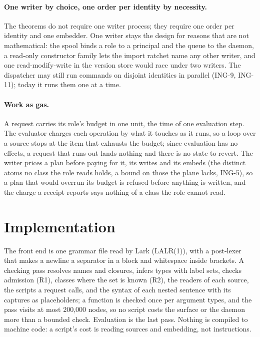 \documentclass[11pt]{article}
\theoremstyle{plain}
\theoremstyle{definition}
\theoremstyle{remark}
\newcommand{\ing}[1]{ING-#1}
\begin{document}
\paragraph{One writer by choice, one order per identity by necessity.}
The theorems do not require one writer process; they require one order per identity and one
embedder. One writer stays the design for reasons that are not mathematical: the spool binds a
role to a principal and the queue to the daemon, a read-only constructor family lets the import
ratchet name any other writer, and one read-modify-write in the version store would race under
two writers. The dispatcher may still run commands on disjoint identities in parallel
(\ing{9}, \ing{11}); today it runs them one at a time.

\paragraph{Work as gas.}
A request carries its role's budget in one unit, the time of one evaluation step. The evaluator
charges each operation by what it touches as it runs, so a loop over a source stops at the item
that exhausts the budget; since evaluation has no effects, a request that runs out lands
nothing and there is no state to revert. The writer prices a plan before paying for it, its
writes and its embeds (the distinct atoms no class the role reads holds, a bound on those the
plane lacks, \ing{5}), so a plan that would overrun its budget is refused before anything is
written, and the charge a receipt reports says nothing of a class the role cannot read.

\section{Implementation}

The front end is one grammar file read by Lark (LALR(1)), with a post-lexer that makes a newline
a separator in a block and whitespace inside brackets. A checking pass resolves names and
closures, infers types with label sets, checks admission (R1), classes where the set is known
(R2), the readers of each source, the scripts a request calls, and the syntax of each nested
sentence with its captures as placeholders; a function is checked once per argument types, and
the pass visits at most 200,000 nodes, so no script costs the surface or the daemon more than a
bounded check. Evaluation is the last pass. Nothing is compiled to machine code: a script's cost
is reading sources and embedding, not instructions.
\end{document}

